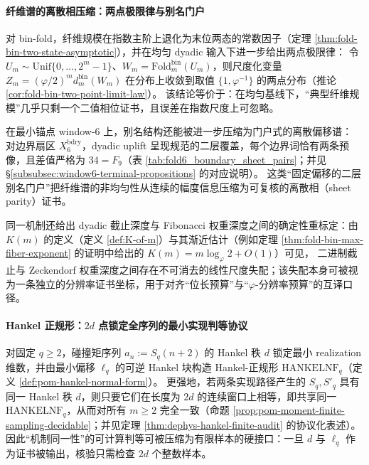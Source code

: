 \paragraph{纤维谱的离散相压缩：两点极限律与别名门户}
对 bin-fold，纤维规模在指数主阶上退化为末位两态的常数因子（定理 \ref{thm:fold-bin-two-state-asymptotic}），并在均匀 dyadic 输入下进一步给出两点极限律：
令 \(U_m\sim\mathrm{Unif}\{0,\dots,2^m-1\}\)、\(W_m=\mathrm{Fold}^{\mathrm{bin}}_m(U_m)\)，则尺度化变量
\(
Z_m=(\varphi/2)^m d^{\mathrm{bin}}_m(W_m)
\)
在分布上收敛到取值 \(\{1,\varphi^{-1}\}\) 的两点分布（推论 \ref{cor:fold-bin-two-point-limit-law}）。
该结论等价于：在均匀基线下，“典型纤维规模”几乎只剩一个二值相位证书，且误差在指数尺度上可忽略。
\par
在最小锚点 window-\(6\) 上，别名结构还能被进一步压缩为门户式的离散偏移谱：
对边界扇区 \(X_6^{\mathrm{bdry}}\)，dyadic uplift 呈现规范的二层覆盖，每个边界词恰有两条预像，且差值严格为 \(34=F_9\)（表 \ref{tab:fold6_boundary_sheet_pairs}；并见 \S\ref{subsubsec:window6-terminal-propositions} 的对应说明）。
这类“固定偏移的二层别名门户”把纤维谱的非均匀性从连续的幅度信息压缩为可复核的离散相（sheet parity）证书。
\par
同一机制还给出 dyadic 截止深度与 Fibonacci 权重深度之间的确定性重标定：由 \(K(m)\) 的定义（定义 \ref{def:K-of-m}）与其渐近估计（例如定理 \ref{thm:fold-bin-max-fiber-exponent} 的证明中给出的 \(K(m)=m\log_\varphi 2+O(1)\)）可见，
二进制截止与 Zeckendorf 权重深度之间存在不可消去的线性尺度失配；该失配本身可被视为一条独立的分辨率证书坐标，用于对齐“位长预算”与“\(\varphi\)-分辨率预算”的互译口径。

\paragraph{Hankel 正规形：\texorpdfstring{$2d$}{2d} 点锁定全序列的最小实现判等协议}
对固定 \(q\ge 2\)，碰撞矩序列 \(a_n:=S_q(n+2)\) 的 Hankel 秩 \(d\) 锁定最小 realization 维数，并由最小偏移 \(\ell_q\) 的可逆 Hankel 块构造 Hankel-正规形
\(\mathrm{HANKELNF}_q\)（定义 \ref{def:pom-hankel-normal-form}）。
更强地，若两条实现路径产生的 \(S_q,S'_q\) 具有同一 Hankel 秩 \(d\)，则只要它们在长度为 \(2d\) 的连续窗口上相等，即共享同一 \(\mathrm{HANKELNF}_q\)，从而对所有 \(m\ge 2\) 完全一致（命题 \ref{prop:pom-moment-finite-sampling-decidable}；并见定理 \ref{thm:dephys-hankel-finite-audit} 的协议化表述）。
因此“机制同一性”的可计算判等可被压缩为有限样本的硬接口：一旦 \(d\) 与 \(\ell_q\) 作为证书被输出，核验只需检查 \(2d\) 个整数样本。

